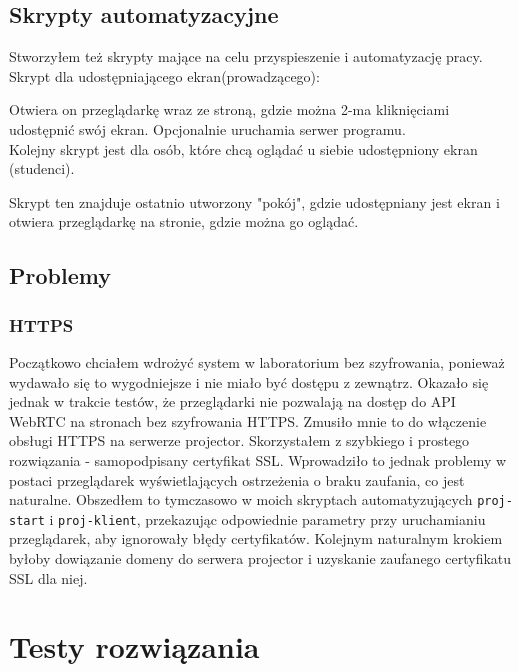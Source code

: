 \documentclass[a4paper,11pt]{article}
\begin{document}
        \subsection{Skrypty automatyzacyjne}
        Stworzyłem też skrypty mające na celu przyspieszenie i automatyzację pracy.
        Skrypt dla udostępniającego ekran(prowadzącego):
        
        Otwiera on przeglądarkę wraz ze stroną, gdzie można 2-ma kliknięciami udostępnić swój ekran. Opcjonalnie uruchamia serwer programu. 
        \\ Kolejny skrypt jest dla osób, które chcą oglądać u siebie udostępniony ekran (studenci).
        
        Skrypt ten znajduje ostatnio utworzony "pokój", gdzie udostępniany jest ekran i otwiera przeglądarkę na stronie, gdzie można go oglądać.
        \subsection{Problemy}
            \subsubsection{HTTPS}
            Początkowo chciałem wdrożyć system w laboratorium bez szyfrowania, ponieważ wydawało się to wygodniejsze i nie miało być dostępu z zewnątrz.
            Okazało się jednak w trakcie testów, że przeglądarki nie pozwalają na dostęp do API WebRTC na stronach bez szyfrowania HTTPS.
            Zmusiło mnie to do włączenie obsługi HTTPS na serwerze projector. Skorzystałem z szybkiego i prostego rozwiązania - samopodpisany certyfikat SSL.
            Wprowadziło to jednak problemy w postaci przeglądarek wyświetlających ostrzeżenia o braku zaufania, co jest naturalne. 
            Obszedłem to tymczasowo w moich skryptach automatyzujących \texttt{proj-start} i \texttt{proj-klient}, przekazując odpowiednie parametry przy uruchamianiu przeglądarek, aby ignorowały błędy certyfikatów.
            Kolejnym naturalnym krokiem byłoby dowiązanie domeny do serwera projector i uzyskanie zaufanego certyfikatu SSL dla niej. 
    \section{Testy rozwiązania}
\end{document}
